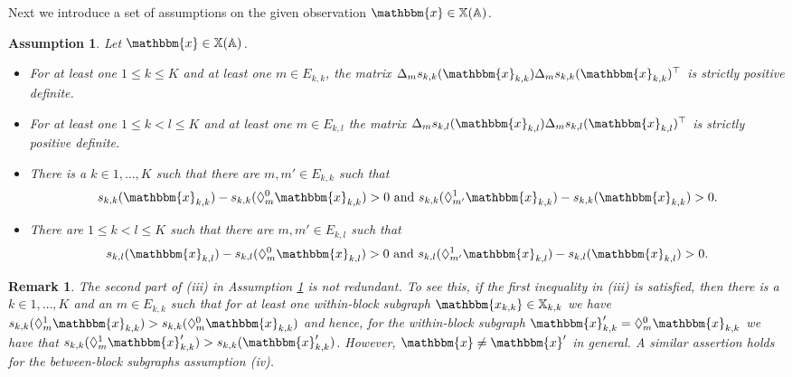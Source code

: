 \documentclass{article}
\newtheorem{Remark}[Theorem]{Remark}
\newtheorem{Assumption}[Theorem]{Assumption}
\begin{document}
Next we introduce a set of assumptions on the given observation $\mathbbm{x} \in \mathbb{X}(\mathbb{A})$.

\begin{Assumption}\label{assumption_observation}
    Let $\mathbbm{x} \in \mathbb{X}(\mathbb{A})$.
    \begin{itemize}
        \item[(i)] For at least one $1 \leq k \leq K$ and at least one $m \in E_{k,k}$, the matrix $\Delta_ms_{k,k}(\mathbbm{x}_{k,k})\Delta_m s_{k,k}(\mathbbm{x}_{k,k})^{\top}$ is strictly positive definite.
        \item[(ii)] For at least one  $1 \leq k < l \leq K$ and at least one $m \in E_{k,l}$ the matrix $\Delta_ms_{k,l}(\mathbbm{x}_{k,l})\Delta_m s_{k,l}(\mathbbm{x}_{k,l})^{\top}$ is strictly positive definite.
        \item[(iii)]  There is a $k \in 1, \ldots, K$  such that there are  $m, m' \in E_{k,k}$ such that 
        \begin{align*} 
            s_{k,k}(\mathbbm{x}_{k,k}) -s_{k,k}(\Diamond_{m}^{0}\mathbbm{x}_{k,k}) > 0 \text{ and } s_{k,k}(\Diamond_{m'}^{1}\mathbbm{x}_{k,k}) -s_{k,k}(\mathbbm{x}_{k,k}) > 0.     
        \end{align*}  
        \item[(iv)] There are $ 1 \leq k < l  \leq K $ such that there are   $m,  m' \in E_{k,l}$  such that 
        \begin{align*} 
            s_{k,l}(\mathbbm{x}_{k,l}) -s_{k,l}(\Diamond_{m}^{0}\mathbbm{x}_{k,l}) > 0 \text{ and } s_{k,l}(\Diamond_{m'}^{1}\mathbbm{x}_{k,l}) -s_{k,l}(\mathbbm{x}_{k,l}) > 0 .
        \end{align*}
    \end{itemize}
\end{Assumption}

\begin{Remark}
    The second part of (iii) in Assumption \ref{assumption_observation} is not redundant. To see this, if the first inequality in (iii) is satisfied, then there is a $k \in 1, \ldots, K$ and an $m\in E_{k,k}$ such that for at least one within-block subgraph $\mathbbm{x_{k,k}} \in \mathbb{X}_{k,k} $ we have $ s_{k,k}(\Diamond_{m}^{1}\mathbbm{x}_{k,k}) > s_{k,k}(\Diamond_{m}^{0}\mathbbm{x}_{k,k})$ and hence, for the within-block subgraph $\mathbbm{x}'_{k,k} = \Diamond_{m}^{0}\mathbbm{x}_{k,k}$ we have that  $ s_{k,k}(\Diamond_{m}^{1}\mathbbm{x}'_{k,k}) > s_{k,k}(\mathbbm{x}'_{k,k})$. However, $\mathbbm{x} \ne \mathbbm{x}'$ in general.  A similar assertion holds for the between-block subgraphs assumption (iv).
\end{Remark}
\end{document}
